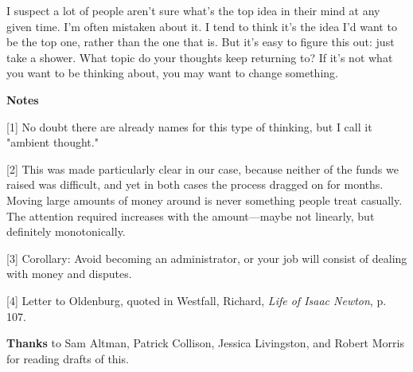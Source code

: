 I suspect a lot of people aren't
                  sure what's the top idea in their mind at any given time. I'm
                  often mistaken about it. I tend to think it's the idea I'd
                  want to be the top one, rather than the one that is. But it's
                  easy to figure this out: just take a shower. What topic do
                  your thoughts keep returning to? If it's not what you want to
                  be thinking about, you may want to change something.







\textbf{Notes}

[1] No doubt there are already names for this type of thinking,
                  but I call it "ambient thought."

[2] This was made particularly clear in our case, because
                  neither of the funds we raised was difficult, and yet in both
                  cases the process dragged on for months. Moving large amounts
                  of money around is never something people treat casually. The
                  attention required increases with the amount---maybe not
                  linearly, but definitely monotonically.

[3] Corollary: Avoid becoming an administrator, or your job
                  will consist of dealing with money and disputes.

[4] Letter to Oldenburg, quoted in Westfall, Richard,
                  \emph{Life of Isaac Newton}, p. 107.

\textbf{Thanks}
                  to Sam Altman, Patrick Collison, Jessica Livingston, and
                  Robert Morris for reading drafts of this.


              
            
          
            
              
                


                  
              
            
          
